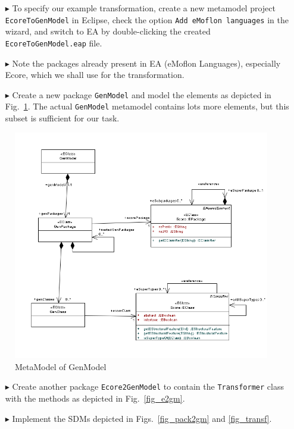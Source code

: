 \begin{enumerate}
\item[$\blacktriangleright$] To specify our example transformation, create a new metamodel project \texttt{EcoreToGenModel} in Eclipse, check the option \texttt{Add eMoflon languages} in the wizard, and switch to EA by double-clicking the created \texttt{Ecore\-To\-Gen\-Model.eap} file.
\item[$\blacktriangleright$] Note the packages already present in EA (eMoflon Languages), especially \textsf{Ecore}, which we shall use for the transformation.
\item[$\blacktriangleright$] Create a new package \texttt{GenModel} and model the elements as depicted in Fig.~\ref{fig_gMM}.
The actual \texttt{GenModel} metamodel contains lots more elements, but this subset is sufficient for our task.
\end{enumerate}
\begin{figure}[htbp]
\begin{center}  
	\includegraphics[width=1.0\textwidth]{pics/Ecore2GenModel_Bilder/EA_genMETAmodel.png}
	\caption{MetaModel of GenModel}  
\label{fig_gMM}
\end{center}
\end{figure} 

\begin{enumerate}  
\item[$\blacktriangleright$] Create another package \texttt{Ecore2GenModel} to contain the \texttt{Transformer} class with the methods as depicted in Fig.~\ref{fig_e2gm}.
\item[$\blacktriangleright$] Implement the SDMs depicted in Figs.~\ref{fig_pack2gm} and \ref{fig_transf}.
\end{enumerate}

